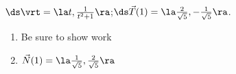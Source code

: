 {$\ds \vrt = \la t,\frac{1}{t^2+1}\ra$;\quad $\ds \vec T(1) = \la \frac2{\sqrt{5}}, -\frac1{\sqrt{5}}\ra$.
}
{\begin{enumerate}
	\item Be sure to show work
	\item	$\vec N(1) = \la \frac1{\sqrt{5}}, \frac2{\sqrt{5}}\ra$
\end{enumerate}
}